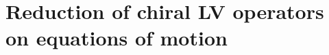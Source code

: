 \documentclass[12pt]{revtex4}
\begin{document}

\section{Reduction of chiral LV operators on equations of motion}
\label{app_reduction}
\end{document}
